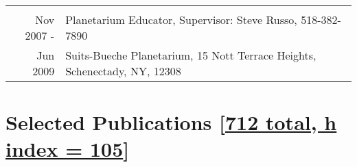 \documentclass[10pt]{article} %
\begin{document}
\begin{tabulary}{\textwidth}{RL}
\vspace{5pt} \\

Nov 2007 -     & Planetarium Educator, Supervisor: Steve Russo, 518-382-7890 \\
 Jun 2009      & Suits-Bueche Planetarium, 15 Nott Terrace Heights, Schenectady, NY, 12308 \\ %

%

\end{tabulary}


\section{Selected Publications [\href{https://inspirehep.net/author/profile/T.Perry.1}{712 total, h index = 105}]}
\end{document}
